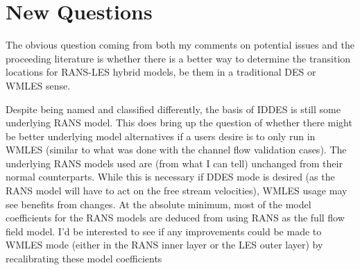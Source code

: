 \documentclass{ucb}
\begin{document}

\section{New Questions}
The obvious question coming from both my comments on potential issues and the proceeding literature is whether there is a better way to determine the transition locations for RANS-LES hybrid models, be them in a traditional DES or WMLES sense.

Despite being named and classified differently, the basis of IDDES is still some underlying RANS model. This does bring up the question of whether there might be better underlying model alternatives if a users desire is to only run in WMLES (similar to what was done with the channel flow validation cases). 
The underlying RANS models used are (from what I can tell) unchanged from their normal counterparts. While this is necessary if DDES mode is desired (as the RANS model will have to act on the free stream velocities), WMLES usage may see benefits from changes. At the absolute minimum, most of the model coefficients for the RANS models are deduced from using RANS as the full flow field model. I'd be interested to see if any improvements could be made to WMLES mode (either in the RANS inner layer or the LES outer layer) by recalibrating these model coefficients
\ucbbib{}
    
\end{document}
